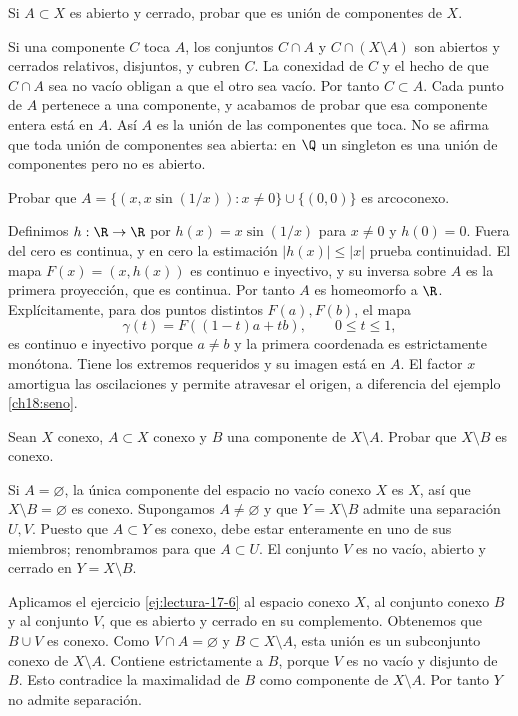 \begin{ejercicio}\label{ej:lectura-18-4}
Si $A\subset X$ es abierto y cerrado, probar que es unión de componentes de $X$.
\end{ejercicio}
\begin{solucion}
Si una componente $C$ toca $A$, los conjuntos $C\cap A$ y $C\cap(X\setminus A)$ son abiertos y cerrados relativos, disjuntos, y cubren $C$. La conexidad de $C$ y el hecho de que $C\cap A$ sea no vacío obligan a que el otro sea vacío. Por tanto $C\subset A$. Cada punto de $A$ pertenece a una componente, y acabamos de probar que esa componente entera está en $A$. Así $A$ es la unión de las componentes que toca. No se afirma que toda unión de componentes sea abierta: en $\Q$ un singleton es una unión de componentes pero no es abierto.
\end{solucion}

\begin{ejercicio}\label{ej:lectura-18-5}
Probar que $A=\{(x,x\sin(1/x)):x\ne0\}\cup\{(0,0)\}$ es arcoconexo.
\end{ejercicio}
\begin{solucion}
Definimos $h:\R\to\R$ por $h(x)=x\sin(1/x)$ para $x\ne0$ y $h(0)=0$. Fuera del cero es continua, y en cero la estimación $|h(x)|\le|x|$ prueba continuidad. El mapa $F(x)=(x,h(x))$ es continuo e inyectivo, y su inversa sobre $A$ es la primera proyección, que es continua. Por tanto $A$ es homeomorfo a $\R$. Explícitamente, para dos puntos distintos $F(a),F(b)$, el mapa
\[
\gamma(t)=F((1-t)a+tb),\qquad0\le t\le1,
\]
es continuo e inyectivo porque $a\ne b$ y la primera coordenada es estrictamente monótona. Tiene los extremos requeridos y su imagen está en $A$. El factor $x$ amortigua las oscilaciones y permite atravesar el origen, a diferencia del ejemplo \ref{ch18:seno}.
\end{solucion}

\begin{ejercicio}\label{ej:lectura-18-6}
Sean $X$ conexo, $A\subset X$ conexo y $B$ una componente de $X\setminus A$. Probar que $X\setminus B$ es conexo.
\end{ejercicio}
\begin{solucion}
Si $A=\varnothing$, la única componente del espacio no vacío conexo $X$ es $X$, así que $X\setminus B=\varnothing$ es conexo. Supongamos $A\ne\varnothing$ y que $Y=X\setminus B$ admite una separación $U,V$. Puesto que $A\subset Y$ es conexo, debe estar enteramente en uno de sus miembros; renombramos para que $A\subset U$. El conjunto $V$ es no vacío, abierto y cerrado en $Y=X\setminus B$.

Aplicamos el ejercicio \ref{ej:lectura-17-6} al espacio conexo $X$, al conjunto conexo $B$ y al conjunto $V$, que es abierto y cerrado en su complemento. Obtenemos que $B\cup V$ es conexo. Como $V\cap A=\varnothing$ y $B\subset X\setminus A$, esta unión es un subconjunto conexo de $X\setminus A$. Contiene estrictamente a $B$, porque $V$ es no vacío y disjunto de $B$. Esto contradice la maximalidad de $B$ como componente de $X\setminus A$. Por tanto $Y$ no admite separación.
\end{solucion}

